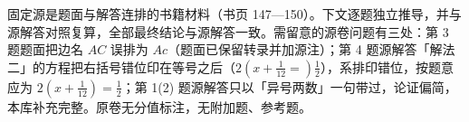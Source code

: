 

\begin{gktip}
固定源是题面与解答连排的书籍材料（书页 147—150）。下文逐题独立推导，并与源解答对照复算，全部最终结论与源解答一致。需留意的源卷问题有三处：第 3 题题面把边名 $AC$ 误排为 $Ac$（题面已保留转录并加源注）；第 4 题源解答「解法二」的方程把右括号错位印在等号之后（$2\left(x+\frac{1}{12}=\right)\frac{1}{2}$），系排印错位，按题意应为 $2\left(x+\frac{1}{12}\right)=\frac{1}{2}$；第 1(2) 题源解答只以「异号两数」一句带过，论证偏简，本库补充完整。原卷无分值标注，无附加题、参考题。
\end{gktip}

